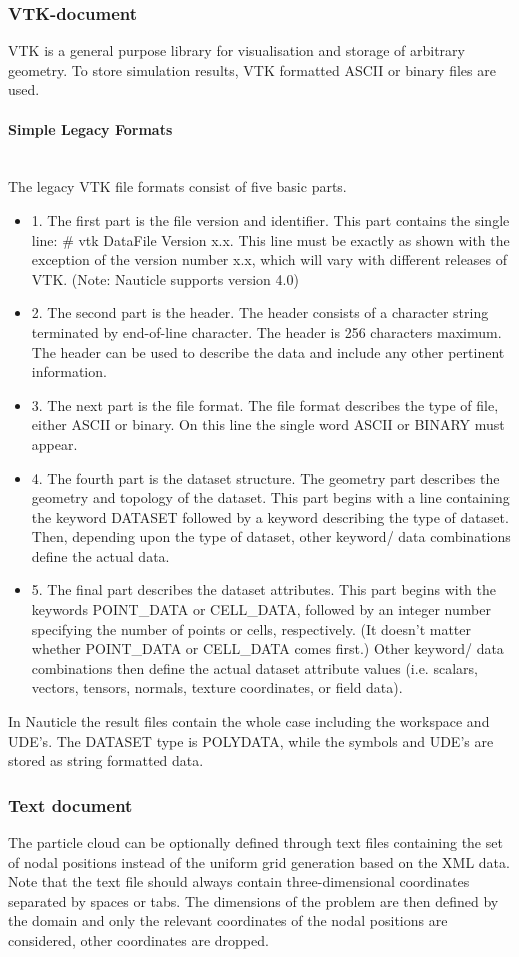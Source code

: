 \documentclass[a4paper,12pt,openany]{book}
\newcommand{\myparagraph}[1]{\paragraph{#1}\mbox{}\\}
\theoremstyle{break}
\begin{document}
\subsubsection{VTK-document}
VTK is a general purpose library for visualisation and storage of arbitrary geometry. To store simulation results, VTK formatted ASCII or binary files are used.
\myparagraph{Simple Legacy Formats}
The legacy VTK file formats consist of five basic parts.
\begin{itemize}
\item 1. The first part is the file version and identifier. This part contains the single line: \# vtk DataFile Version x.x. This line must be exactly as shown with the exception of the version number x.x, which will vary with different releases of VTK. (Note: Nauticle supports version 4.0) 
\item 2. The second part is the header. The header consists of a character string terminated by end-of-line character. The header is 256 characters maximum. The header can be used to describe the data and include any other pertinent information. 
\item 3. The next part is the file format. The file format describes the type of file, either ASCII or binary. On this line the single word ASCII or BINARY must appear. 
\item 4. The fourth part is the dataset structure. The geometry part describes the geometry and topology of the dataset. This part begins with a line containing the keyword DATASET followed by a keyword describing the type of dataset. Then, depending upon the type of dataset, other keyword/ data combinations define the actual data.
\item 5. The final part describes the dataset attributes. This part begins with the keywords POINT\_DATA or CELL\_DATA, followed by an integer number specifying the number of points or cells, respectively. (It doesn't matter whether POINT\_DATA or CELL\_DATA comes first.) Other keyword/ data combinations then define the actual dataset attribute values (i.e. scalars, vectors, tensors, normals, texture coordinates, or field data). 
\end{itemize}
In Nauticle the result files contain the whole case including the workspace and UDE's. The DATASET type is POLYDATA, while the symbols and UDE's are stored as string formatted data.
\subsubsection{Text document}
The particle cloud can be optionally defined through text files containing the set of nodal positions instead of the uniform grid generation based on the XML data. Note that the text file should always contain three-dimensional coordinates separated by spaces or tabs. The dimensions of the problem are then defined by the domain and only the relevant coordinates of the nodal positions are considered, other coordinates are dropped.
\end{document}
